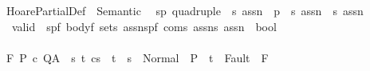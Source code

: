 %
\begin{isabellebody}%
%
%
\isamarkuptrue%
%
\isadelimtheory
%
\endisadelimtheory
%
\isatagtheory
{}\isamarkupfalse%
\ HoarePartialDef\ \ Semantic\ %
\endisatagtheory
{\isafoldtheory}%
%
\isadelimtheory
%
\endisadelimtheory
\isanewline
\isanewline
{}\isamarkupfalse%
\ {\isacharparenleft}{\isacharprime}s{\isacharcomma}{\isacharprime}p{\isacharparenright}\ quadruple\ {\isacharequal}\ {\isachardoublequoteopen}{\isacharparenleft}{\isacharprime}s\ assn\ {\isasymtimes}\ {\isacharprime}p\ {\isasymtimes}\ {\isacharprime}s\ assn\ {\isasymtimes}\ {\isacharprime}s\ assn{\isacharparenright}{\isachardoublequoteclose}%
\isamarkuptrue%
\isamarkupfalse%
\isanewline
\ \ valid\ {\isacharcolon}{\isacharcolon}\ {\isachardoublequoteopen}{\isacharbrackleft}{\isacharparenleft}{\isacharprime}s{\isacharcomma}{\isacharprime}p{\isacharcomma}{\isacharprime}f{\isacharparenright}\ body{\isacharcomma}{\isacharprime}f\ set{\isacharcomma}{\isacharprime}s\ assn{\isacharcomma}{\isacharparenleft}{\isacharprime}s{\isacharcomma}{\isacharprime}p{\isacharcomma}{\isacharprime}f{\isacharparenright}\ com{\isacharcomma}{\isacharprime}s\ assn{\isacharcomma}{\isacharprime}s\ assn{\isacharbrackright}\ {\isacharequal}{\isachargreater}\ bool{\isachardoublequoteclose}\isanewline
\ \ \ \ \ \ \ \ \ \ \ \ \ \ \ \ {\isacharparenleft}{\isachardoublequoteopen}{\isacharunderscore}{\isasymTurnstile}\isactrlbsub {\isacharprime}{\isacharslash}{\isacharunderscore}\isactrlesub {\isacharslash}\ {\isacharunderscore}\ {\isacharunderscore}\ {\isacharunderscore}{\isacharcomma}{\isacharunderscore}{\isachardoublequoteclose}\ \ {\isacharbrackleft}{}{}{\isacharcomma}{}{}{\isacharcomma}{}{}{}{}{\isacharcomma}\ {}{}{\isacharcomma}\ {}{}{}{}{\isacharcomma}{}{}{}{}{\isacharbrackright}\ {}{}{\isacharparenright}\isanewline
{}\isanewline
\ {\isachardoublequoteopen}{\isasymGamma}{\isasymTurnstile}\isactrlbsub {\isacharslash}F\isactrlesub \ P\ c\ Q{\isacharcomma}A\ {\isasymequiv}\ {\isasymforall}s\ t{\isachardot}\ {\isasymGamma}{\isasymturnstile}{\isasymlangle}c{\isacharcomma}s{\isasymrangle}\ {\isasymRightarrow}\ t\ {\isasymlongrightarrow}\ s\ {\isasymin}\ Normal\ {\isacharbackquote}\ P\ {\isasymlongrightarrow}\ t\ {\isasymnotin}\ Fault\ {\isacharbackquote}\ F\ \ \isanewline

\end{isabellebody}
